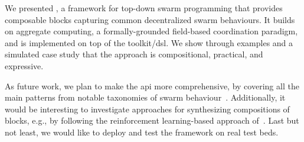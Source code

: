 We presented \MacroSwarm{},
 a framework 
 for top-down swarm programming
 that provides composable blocks 
 capturing common decentralized swarm behaviours.
%
It builds on aggregate computing,
 a formally-grounded field-based coordination paradigm,
 and is implemented on top of the \scafi{} toolkit/\ac{dsl}.
%
We show through examples and a simulated case study
 that the approach is compositional, practical, and expressive.

As future work,
 we plan to make the \ac{api} more comprehensive,
 by covering all the main patterns from notable taxonomies of swarm behaviour~\cite{DBLP:journals/swarm/BrambillaFBD13}.
%
Additionally, it would be interesting to investigate approaches for synthesizing compositions of \MacroSwarm{} blocks, e.g., by following the reinforcement learning-based approach of~\cite{DBLP:conf/coordination/AguzziCV22}.
%
Last but not least, we would like to deploy and test the framework on real test beds.

\printbibliography
